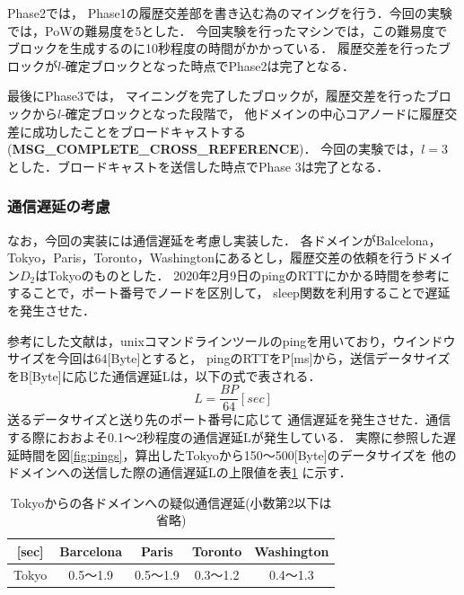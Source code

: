 \documentclass[a4paper,12pt]{jsarticle}
\begin{document}
Phase2では，
Phase1の履歴交差部を書き込む為のマイングを行う．今回の実験では，PoWの難易度を5とした．
今回実験を行ったマシンでは，この難易度でブロックを生成するのに10秒程度の時間がかかっている．
履歴交差を行ったブロックが$l$-確定ブロックとなった時点でPhase2は完了となる．

最後にPhase3では，
マイニングを完了したブロックが，履歴交差を行ったブロックから$l$-確定ブロックとなった段階で，
他ドメインの中心コアノードに履歴交差に成功したことをブロードキャストする
 (\textbf{MSG\_COMPLETE\_CROSS\_REFERENCE})．
今回の実験では，$l=3$とした．ブロードキャストを送信した時点でPhase 3は完了となる．



\subsubsection{通信遅延の考慮}

なお，今回の実装には通信遅延を考慮し実装した．
各ドメインがBalcelona，Tokyo，Paris，Toronto，Washingtonにあるとし，履歴交差の依頼を行うドメイン$D_2$はTokyoのものとした．
2020年2月9日のpingのRTTにかかる時間\cite{pings}を参考にすることで，ポート番号でノードを区別して，
sleep関数を利用することで遅延を発生させた．

参考にした文献\cite{pings}は，unixコマンドラインツールのpingを用いており，ウインドウサイズを今回は$64$[Byte]とすると，
pingのRTTをP[ms]から，送信データサイズをB[Byte]に応じた通信遅延Lは，以下の式で表される．
\begin{equation}
  \label{byt}
    L = \frac{BP}{64} [sec]
\end{equation}
送るデータサイズと送り先のポート番号に応じて
通信遅延を発生させた．通信する際におおよそ0.1〜2秒程度の通信遅延Lが発生している．
実際に参照した遅延時間を図\ref{fig:pings}，算出したTokyoから150〜500[Byte]のデータサイズを
他のドメインへの送信した際の通信遅延Lの上限値を表\ref{Byte} に示す．

\begin{table}[H]%
  \centering
  \caption{Tokyoからの各ドメインへの疑似通信遅延(小数第2以下は省略)}
  \label{Byte}
  \begin{tabular}{c|c|c|c|c|}
  \cline{2-5}
  [sec]                       & Barcelona &    Paris   &   Toronto  & Washington \\ \hline
  \multicolumn{1}{|c|}{Tokyo} &  0.5〜1.9 &  0.5〜1.9  &  0.3〜1.2  &  0.4〜1.3  \\ \hline
  \end{tabular}
\end{table}
\end{document}
